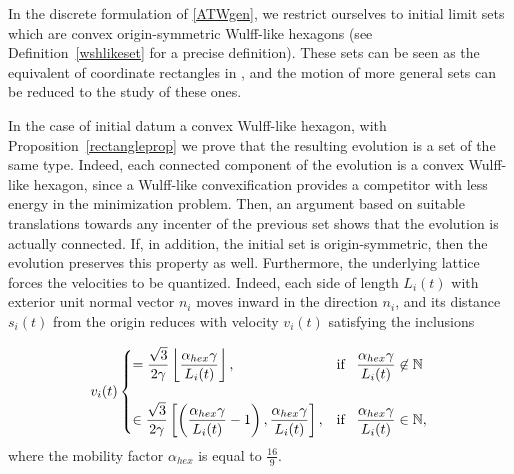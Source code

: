 \documentclass{interact}
\numberwithin{equation}{section}
\theoremstyle{definition}
\begin{document}
In the discrete formulation of \eqref{ATWgen}, we restrict ourselves to initial limit sets which are convex origin-symmetric {Wulff-like} hexagons (see Definition~\ref{wshlikeset} for a precise definition). These sets can be seen as the equivalent of coordinate rectangles in \cite{BGN}, and the motion of more general sets can be reduced to the study of these ones.

In the case of initial datum a convex Wulff-like hexagon, with Proposition~\ref{rectangleprop} we prove that the resulting evolution is a set of the same type. Indeed, each connected component of the evolution is a convex Wulff-like hexagon, since a Wulff-like convexification provides a competitor with less energy in the minimization problem. Then, an argument based on suitable translations towards any incenter of the previous set shows that the evolution is actually connected. If, in addition, the initial set is origin-symmetric, then the evolution preserves this property as well. Furthermore, the underlying lattice forces the velocities to be quantized. Indeed, each side of length $L_{i}(t)$ with exterior unit normal vector $n_i$ moves inward 
in the direction $n_i$, and its distance $s_i(t)$ from the origin reduces with velocity $v_{i}(t)$ satisfying the inclusions

\begin{equation*}
v_{i}(t)
\begin{cases}
=\displaystyle\frac{\sqrt3}{2\gamma}\left\lfloor\frac{\alpha_{hex}\gamma}{L_i(t)}\right\rfloor, & \mbox{if \, $\displaystyle\frac{\alpha_{hex}\gamma}{L_i(t)}\not\in\mathbb{N}$}\\
\\
\in\displaystyle\frac{\sqrt3}{2\gamma}\left[\displaystyle\left(\frac{\alpha_{hex}\gamma}{L_i(t)}-1\right),\displaystyle\frac{\alpha_{hex}\gamma}{L_i(t)}\right], & \mbox{if \, $\displaystyle\frac{\alpha_{hex}\gamma}{L_i(t)}\in\mathbb{N}$},
\end{cases}
\end{equation*}
where the mobility factor $\alpha_{hex}$ is equal to $\frac{16}{9}$.

\end{document}
